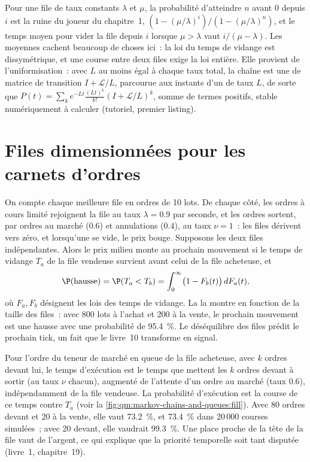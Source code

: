 Pour une file de taux constants $\lambda$ et $\mu$, la probabilité d'atteindre $n$ avant 0 depuis $i$ est la
ruine du joueur du chapitre~1, $(1 - (\mu/\lambda)^i)/(1 - (\mu/\lambda)^n)$, et le temps moyen pour vider la file depuis $i$ lorsque $\mu > \lambda$
vaut $i/(\mu - \lambda)$. Les moyennes cachent beaucoup de choses ici~: la loi du temps de vidange est dissymétrique, et une course entre deux
files exige la loi entière. Elle provient de l'uniformisation~: avec $L$ au moins égal à chaque taux total, la chaîne
est une  de matrice de transition $I + \mathcal L/L$, parcourue aux instants d'un  de taux $L$, de sorte que
$P(t) = \sum_k e^{-Lt}\frac{(Lt)^k}{k!}(I + \mathcal L/L)^k$, somme de termes positifs, stable numériquement à calculer
(tutoriel, premier listing).

\section{Files dimensionnées pour les carnets d'ordres}

On compte chaque meilleure file en ordres de 10 lots. De chaque côté, les ordres à cours limité rejoignent la file au taux $\lambda = 0.9$ par seconde, et
les ordres sortent, par ordres au marché ($0.6$) et annulations ($0.4$), au taux $\nu = 1$~: les files dérivent vers
zéro, et lorsqu'une se vide, le prix bouge. Supposons les deux files indépendantes. Alors le prix milieu monte
au prochain mouvement si le temps de vidange $T_a$ de la file vendeuse survient avant celui de la file acheteuse, et
\[
\P(\text{hausse}) = \P(T_a < T_b) = \int_0^\infty\bigl(1 - F_b(t)\bigr)\,dF_a(t),
\]
où $F_a, F_b$ désignent les lois des temps de vidange. La  la montre en
fonction de la taille des files~: avec 800 lots à l'achat et 200 à la vente, le prochain mouvement est une hausse avec une probabilité de 95.4~\%. Le
déséquilibre des files prédit le prochain tick, un fait que le livre~10 transforme en signal.

Pour l'ordre du teneur de marché en queue de la file acheteuse, avec $k$ ordres devant lui, le temps d'exécution est le temps que
mettent les $k$ ordres devant à sortir (au taux $\nu$ chacun), augmenté de l'attente d'un ordre au marché (taux $0.6$), indépendamment de
la file vendeuse. La probabilité d'exécution est la course de ce temps contre $T_a$
(voir la \cref{fig:qm:markov-chains-and-queues:fill}). Avec 80 ordres devant et 20 à la vente, elle vaut 73.2~\%, et
73.4~\% dans 20\,000 courses simulées~; avec 20 devant, elle vaudrait 99.3~\%. Une place proche de la tête de la file
vaut de l'argent, ce qui explique que la priorité temporelle soit tant disputée (livre~1, chapitre~19).

